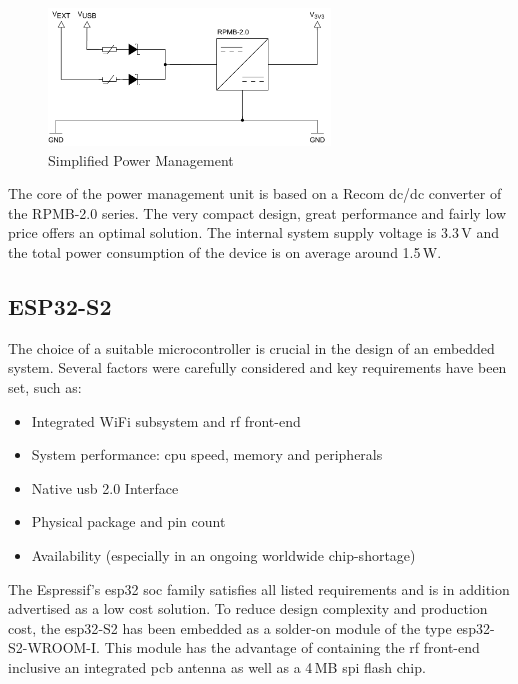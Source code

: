 \begin{figure}
\vspace{-0.6cm}
\includegraphics[width=7.5cm]{images/power}
\vspace{-0.4cm}
\caption{Simplified Power Management}
\label{fig:simplified-power}
\end{figure} 
The core of the power management unit is based on a Recom \acrshort{dc}/\acrshort{dc} converter of the RPMB-2.0 series. The very compact design, great performance and fairly low price offers an optimal solution. The internal system supply voltage is 3.3\,V and the total power consumption of the device is on average around 1.5\,W.
\clearpage

\subsection{ESP32-S2} \label{ESP32-S2}
The choice of a suitable microcontroller is crucial in the design of an embedded system. Several factors were carefully considered and key requirements have been set, such as:

\begin{itemize}
		\item Integrated WiFi subsystem and \acrshort{rf} front-end
		\item System performance: \acrshort{cpu} speed, memory and peripherals
		\item Native \acrshort{usb} 2.0 Interface
		\item Physical package and pin count
		\item Availability (especially in an ongoing worldwide chip-shortage)
\end{itemize}

The Espressif's \gls{esp32} \acrfull{soc} family satisfies all listed requirements and is in addition advertised as a low cost solution.\newline
To reduce design complexity and production cost, the \gls{esp32}-S2 has been embedded as a solder-on module of the type \gls{esp32}-S2-WROOM-I. This module has the advantage of containing the \acrshort{rf} front-end inclusive an integrated \acrshort{pcb} antenna as well as a 4\,MB \acrshort{spi} flash chip.

